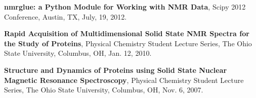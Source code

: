 \documentclass[margin,line]{res}
\begin{document}
\begin{resume}
{\bf nmrglue: a Python Module for Working with NMR Data},
Scipy 2012 Conference, Austin, TX, July, 19, 2012.

{\bf Rapid Acquisition of Multidimensional Solid State NMR Spectra for the Study of
Proteins},
Physical Chemistry Student Lecture Series, The Ohio State University, Columbus, OH, Jan. 12, 2010.

{\bf Structure and Dynamics of Proteins using Solid State Nuclear Magnetic Resonance
Spectroscopy},
Physical Chemistry Student Lecture Series, The Ohio State University, Columbus, OH, Nov. 6, 2007.

\end{resume}
\end{document}
